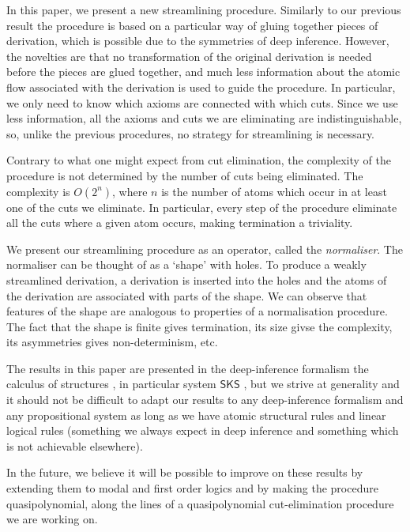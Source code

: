 \documentclass[a4paper]{llncs}
\begin{document}
In this paper, we present a new streamlining procedure. Similarly to our previous result the procedure is based on a particular way of gluing together pieces of derivation, which is possible due to the symmetries of deep inference. However, the novelties are that no transformation of the original derivation is needed before the pieces are glued together, and much less information about the atomic flow associated with the derivation is used to guide the procedure. In particular, we only need to know which axioms are connected with which cuts. Since we use less information, all the axioms and cuts we are eliminating are indistinguishable, so, unlike the previous procedures, no strategy for streamlining is necessary.

Contrary to what one might expect from cut elimination, the complexity of the procedure is not determined by the number of cuts being eliminated. The complexity is $O(2^n)$, where $n$ is the number of atoms which occur in at least one of the cuts we eliminate. In particular, every step of the procedure eliminate all the cuts where a given atom occurs, making termination a triviality.

We present our streamlining procedure as an operator, called the \emph{normaliser}. The normaliser can be thought of as a `shape' with holes. To produce a weakly streamlined derivation, a derivation is inserted into the holes and the atoms of the derivation are associated with parts of the shape. We can observe that features of the shape are analogous to properties of a normalisation procedure. The fact that the shape is finite gives termination, its size givse the complexity, its asymmetries gives non-determinism, etc.

\newcommand{\SKS}{\mathsf{SKS}}
The results in this paper are presented in the deep-inference formalism the calculus of structures \cite{Gugl:06:A-System:kl}, in particular system $\SKS$ \cite{BrunTiu:01:A-Local-:mz,Brun:04:Deep-Inf:rq}, but we strive at generality and it should not be difficult to adapt our results to any deep-inference formalism and any propositional system as long as we have atomic structural rules and linear logical rules (something we always expect in deep inference and something which is not achievable elsewhere).

In the future, we believe it will be possible to improve on these results by extending them to modal \cite{Brun:07:Deep-Seq:fk,HeinStew:05:Purity-T:tg,StewStou:05:A-System:tg,Stou:06:A-Deep-I:rt} and first order \cite{Brun:04:Deep-Inf:rq,Brun:06:Cut-Elim:cq} logics and by making the procedure quasipolynomial, along the lines of a quasipolynomial cut-elimination procedure we are working on.
\end{document}
